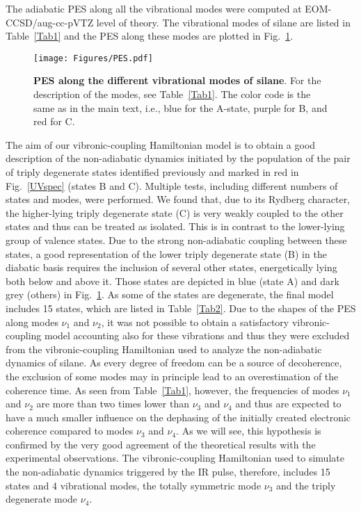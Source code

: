 \documentclass[12pt]{article}
\begin{document}
The adiabatic PES along all the vibrational modes were computed at EOM-CCSD/aug-cc-pVTZ level of theory. The vibrational modes of silane are listed in Table~\ref{Tab1} and the PES along these modes are plotted in Fig.~\ref{pes}. 

\begin{figure}[ht!]
\centering
\texttt{[image: Figures/PES.pdf]}
\caption{\label{pes}\textbf{PES along the different vibrational modes of silane}. For the description of the modes, see Table~\ref{Tab1}. The color code is the same as in the main text, i.e., blue for the A-state, purple for B, and red for C. }
\end{figure}

The aim of our vibronic-coupling Hamiltonian model is to obtain a good description of the non-adiabatic dynamics initiated by the population of the pair of triply degenerate states identified previously and marked in red in Fig.~\ref{UVspec} (states B and C). Multiple tests, including different numbers of states and modes, were performed. We found that, due to its Rydberg character, the higher-lying triply degenerate state (C) is very weakly coupled to the other states and thus can be treated as isolated. This is in contrast to the lower-lying group of valence states. Due to the strong non-adiabatic coupling between these states, a good representation of the lower triply degenerate state (B) in the diabatic basis requires the inclusion of several other states, energetically lying both below and above it. Those states are depicted in blue (state A) and dark grey (others) in Fig.~\ref{pes}. As some of the states are degenerate, the final model includes 15 states, which are listed in Table~\ref{Tab2}. Due to the shapes of the PES along modes $\nu_1$ and $\nu_2$, it was not possible to obtain a satisfactory vibronic-coupling model accounting also for these vibrations and thus they were excluded from the vibronic-coupling Hamiltonian used to analyze the non-adiabatic dynamics of silane. As every degree of freedom can be a source of decoherence, the exclusion of some modes may in principle lead to an overestimation of the coherence time. As seen from Table~\ref{Tab1}, however, the frequencies of modes $\nu_1$ and $\nu_2$ are more than two times lower than $\nu_3$ and $\nu_4$ and thus are expected to have a much smaller influence on the dephasing of the initially created electronic coherence compared to modes $\nu_3$ and $\nu_4$. As we will see, this hypothesis is confirmed by the very good agreement of the theoretical results with the experimental observations. The vibronic-coupling Hamiltonian used to simulate the non-adiabatic dynamics triggered by the IR pulse, therefore, includes 15 states and 4 vibrational modes, the totally symmetric mode $\nu_3$ and the triply degenerate mode $\nu_4$.
\end{document}
